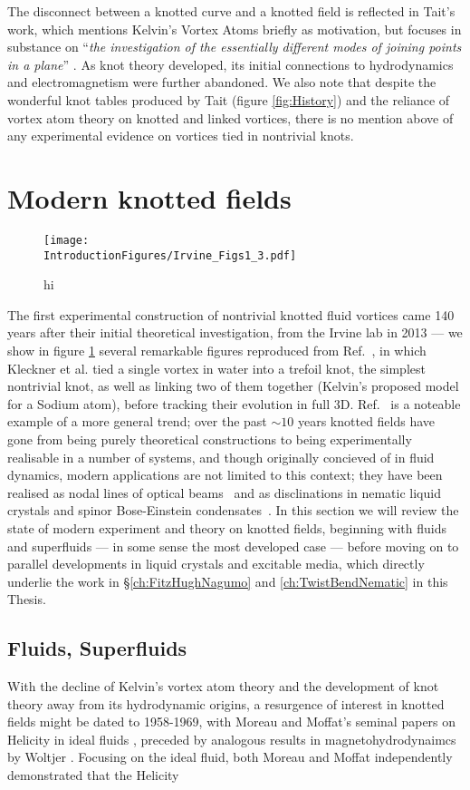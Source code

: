 The disconnect between a knotted curve and a knotted field is reflected in Tait's work, which mentions Kelvin's Vortex Atoms briefly as motivation, but focuses in substance on ``\emph{the investigation of the essentially different modes of joining points in a plane}'' \citep{Tait1}. As knot theory developed, its initial connections to hydrodynamics and electromagnetism were further abandoned. We also note that despite the wonderful knot tables produced by Tait (figure \ref{fig:History}) and the reliance of vortex atom theory on knotted and linked vortices, there is no mention above of any experimental evidence on vortices tied in nontrivial knots. 

\section{Modern knotted fields}
\begin{figure}[htbp]
\centering
\texttt{[image: \\IntroductionFigures/Irvine\_Figs1\_3.pdf]}
\caption{hi }
\label{fig:Irvine}
\end{figure}
The first experimental construction of nontrivial knotted fluid vortices came 140 years after their initial theoretical investigation, from the Irvine lab in 2013 --- we show in figure \ref{fig:Irvine} several remarkable figures reproduced from Ref.~\citep{Kleckner2013}, in which Kleckner et al. tied a single vortex in water into a trefoil knot, the simplest nontrivial knot, as well as linking two of them together (Kelvin's proposed model for a Sodium atom), before tracking their evolution in full 3D. Ref.~\citep{Kleckner2013} is a noteable example of a more general trend; over the past $\sim10$ years knotted fields have gone from being purely theoretical constructions to being experimentally realisable in a number of systems, and though originally concieved of in fluid dynamics, modern applications are not limited to this context; they have been realised as nodal lines of optical beams~\citep{Dennis2010} and as disclinations in nematic liquid crystals and spinor Bose-Einstein condensates~\citep{Tkalec2011,Tasinkevych2014,Copar2015}. In this section we will review the state of modern experiment and theory on knotted fields, beginning with fluids and superfluids --- in some sense the most developed case --- before moving on to parallel developments in liquid crystals and excitable media, which directly underlie the work in \S \ref{ch:FitzHughNagumo} and \ref{ch:TwistBendNematic} in this Thesis.


\subsection{Fluids, Superfluids}
With the decline of Kelvin's vortex atom theory and the development of knot theory away from its hydrodynamic origins, a resurgence of interest in knotted fields might be dated to 1958-1969, with Moreau and Moffat's seminal papers on Helicity in ideal fluids \cite{Moreau,Moffat}, preceded by analogous results in magnetohydrodynaimcs by Woltjer \cite{Woltjer}. Focusing on the ideal fluid, both Moreau and Moffat independently demonstrated that the Helicity

